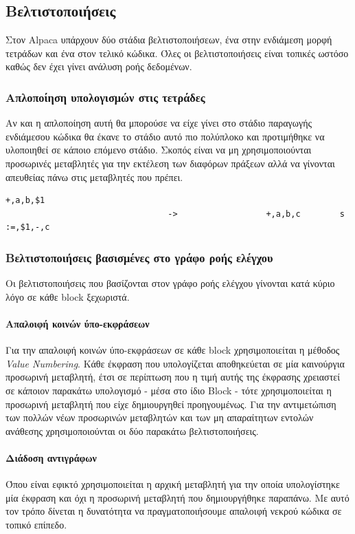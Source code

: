 \documentclass[12pt]{article}
\begin{document}
\subsection{Βελτιστοποιήσεις}
Στον Alpaca υπάρχουν δύο στάδια βελτιστοποιήσεων, ένα στην ενδιάμεση μορφή τετράδων και ένα στον τελικό κώδικα. Όλες οι βελτιστοποιήσεις είναι τοπικές ωστόσο καθώς δεν έχει γίνει ανάλυση ροής δεδομένων.
\subsubsection{Απλοποίηση υπολογισμών στις τετράδες}
Αν και η απλοποίηση αυτή θα μπορούσε να είχε γίνει στο στάδιο παραγωγής ενδιάμεσου κώδικα θα έκανε το στάδιο αυτό πιο πολύπλοκο και προτιμήθηκε να υλοποιηθεί σε κάποιο επόμενο στάδιο. Σκοπός είναι να μη χρησιμοποιούνται προσωρινές μεταβλητές για την εκτέλεση των διαφόρων πράξεων αλλά να γίνονται απευθείας πάνω στις μεταβλητές που πρέπει.
\begin{lstlisting}[label=some-code,caption=Απλοποίηση υπολογισμών στις τετράδες]
+,a,b,$1
                                 ->                  +,a,b,c		s
:=,$1,-,c
\end{lstlisting}
\subsubsection{Βελτιστοποιήσεις βασισμένες στο γράφο ροής ελέγχου}
Οι βελτιστοποιήσεις που βασίζονται στον γράφο ροής ελέγχου γίνονται κατά κύριο λόγο σε κάθε block ξεχωριστά.
\paragraph{Απαλοιφή κοινών ύπο-εκφράσεων}
Για την απαλοιφή κοινών ύπο-εκφράσεων σε κάθε block χρησιμοποιείται η μέθοδος \textit{Value Numbering}. Κάθε έκφραση που υπολογίζεται αποθηκεύεται σε μία καινούργια προσωρινή μεταβλητή, έτσι σε περίπτωση που η τιμή αυτής της έκφρασης χρειαστεί σε κάποιον παρακάτω υπολογισμό - μέσα στο ίδιο Block - τότε χρησιμοποιείται η  προσωρινή μεταβλητή που είχε δημιουργηθεί προηγουμένως. Για την αντιμετώπιση των πολλών νέων προσωρινών μεταβλητών και των μη απαραίτητων εντολών ανάθεσης χρησιμοποιούνται οι δύο παρακάτω βελτιστοποιήσεις.
\paragraph{Διάδοση αντιγράφων}
Όπου είναι εφικτό χρησιμοποιείται η αρχική μεταβλητή για την οποία υπολογίστηκε μία έκφραση και όχι η προσωρινή μεταβλητή που δημιουργήθηκε παραπάνω. Με αυτό τον τρόπο δίνεται η δυνατότητα να πραγματοποιήσουμε απαλοιφή νεκρού κώδικα σε τοπικό επίπεδο.
\end{document}
